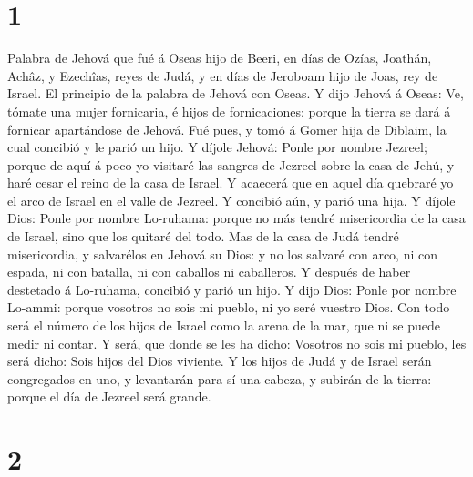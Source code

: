 \hypertarget{section}{%
\section{1}\label{section}}

 Palabra de Jehová que fué á Oseas hijo de Beeri, en días de
Ozías, Joathán, Achâz, y Ezechîas, reyes de Judá, y en días de Jeroboam
hijo de Joas, rey de Israel.  El principio de la palabra de
Jehová con Oseas. Y dijo Jehová á Oseas: Ve, tómate una mujer
fornicaria, é hijos de fornicaciones: porque la tierra se dará á
fornicar apartándose de Jehová.  Fué pues, y tomó á Gomer
hija de Diblaim, la cual concibió y le parió un hijo.  Y
díjole Jehová: Ponle por nombre Jezreel; porque de aquí á poco yo
visitaré las sangres de Jezreel sobre la casa de Jehú, y haré cesar el
reino de la casa de Israel.  Y acaecerá que en aquel día
quebraré yo el arco de Israel en el valle de Jezreel.  Y
concibió aún, y parió una hija. Y díjole Dios: Ponle por nombre
Lo-ruhama: porque no más tendré misericordia de la casa de Israel, sino
que los quitaré del todo.  Mas de la casa de Judá tendré
misericordia, y salvarélos en Jehová su Dios: y no los salvaré con arco,
ni con espada, ni con batalla, ni con caballos ni caballeros.
 Y después de haber destetado á Lo-ruhama, concibió y parió
un hijo.  Y dijo Dios: Ponle por nombre Lo-ammi: porque
vosotros no sois mi pueblo, ni yo seré vuestro Dios.  Con
todo será el número de los hijos de Israel como la arena de la mar, que
ni se puede medir ni contar. Y será, que donde se les ha dicho: Vosotros
no sois mi pueblo, les será dicho: Sois hijos del Dios viviente.
 Y los hijos de Judá y de Israel serán congregados en uno,
y levantarán para sí una cabeza, y subirán de la tierra: porque el día
de Jezreel será grande.

\hypertarget{section-1}{%
\section{2}\label{section-1}}

